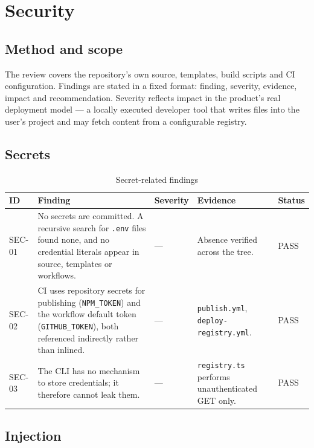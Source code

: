 \chapter{Security}
\label{ch:security}

\section{Method and scope}

The review covers the repository's own source, templates, build scripts and CI
configuration. Findings are stated in a fixed format: finding, severity, evidence,
impact and recommendation. Severity reflects impact in the product's real deployment
model --- a locally executed developer tool that writes files into the user's
project and may fetch content from a configurable registry.

\section{Secrets}

\begin{longtable}{p{1.3cm}p{3.4cm}p{1.9cm}p{6.1cm}p{1.5cm}}
\caption{Secret-related findings}\\
\toprule
\textbf{ID} & \textbf{Finding} & \textbf{Severity} & \textbf{Evidence} & \textbf{Status} \\
\midrule

SEC-01 & No secrets are committed. A recursive search for \texttt{.env} files found
none, and no credential literals appear in source, templates or workflows. & --- &
Absence verified across the tree. & PASS \\
SEC-02 & CI uses repository secrets for publishing
(\texttt{NPM\_TOKEN}) and the workflow default token
(\texttt{GITHUB\_TOKEN}), both referenced indirectly rather than inlined. &
--- & \texttt{publish.yml}, \texttt{deploy-registry.yml}. & PASS \\
SEC-03 & The CLI has no mechanism to store credentials; it therefore cannot leak
them. & --- & \texttt{registry.ts} performs unauthenticated GET only. & PASS \\
\bottomrule
\end{longtable}

\section{Injection}

